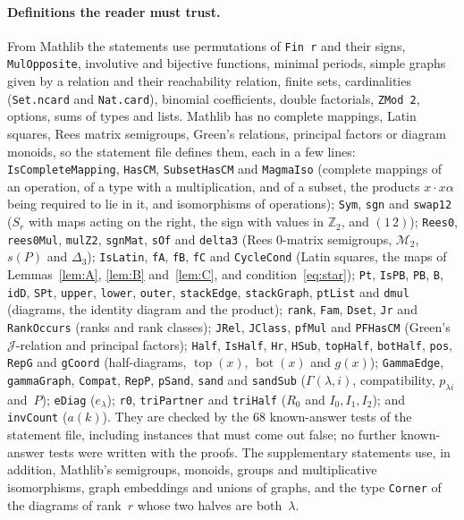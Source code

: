 \documentclass[11pt]{article}
\theoremstyle{remark}
\newcommand{\M}{\mathcal M}
\newcommand{\Z}{\mathbb Z}
\newcommand{\tp}{\operatorname{top}}
\newcommand{\bt}{\operatorname{bot}}
\newcommand{\Mt}{\M_2}
\begin{document}
\paragraph{Definitions the reader must trust.}
From Mathlib the statements use permutations of \texttt{Fin~r} and their
signs, \texttt{MulOpposite}, involutive and bijective functions, minimal
periods, simple graphs given by a relation and their reachability relation,
finite sets, cardinalities (\texttt{Set.ncard} and \texttt{Nat.card}), binomial
coefficients, double factorials, \texttt{ZMod 2}, options, sums of types and
lists. Mathlib has no complete mappings, Latin squares, Rees matrix semigroups,
Green's relations, principal factors or diagram monoids, so the statement file
defines them, each in a few lines: \texttt{IsCompleteMapping}, \texttt{HasCM},
\texttt{SubsetHasCM} and \texttt{MagmaIso} (complete mappings of an operation,
of a type with a multiplication, and of a subset, the products $x\cdot
x\alpha$ being required to lie in it, and isomorphisms of operations); \texttt{Sym}, \texttt{sgn} and \texttt{swap12} ($S_r$ with maps
acting on the right, the sign with values in $\Z_2$, and $(1\,2)$);
\texttt{Rees0}, \texttt{rees0Mul}, \texttt{mulZ2}, \texttt{sgnMat},
\texttt{sOf} and \texttt{delta3} (Rees $0$-matrix semigroups, $\Mt$, $s(P)$
and $\Delta_3$); \texttt{IsLatin}, \texttt{fA}, \texttt{fB}, \texttt{fC} and
\texttt{CycleCond} (Latin squares, the maps of Lemmas~\ref{lem:A},
\ref{lem:B} and~\ref{lem:C}, and condition~\eqref{eq:star}); \texttt{Pt},
\texttt{IsPB}, \texttt{PB}, \texttt{B}, \texttt{idD}, \texttt{SPt},
\texttt{upper}, \texttt{lower}, \texttt{outer}, \texttt{stackEdge},
\texttt{stackGraph}, \texttt{ptList} and \texttt{dmul} (diagrams, the identity
diagram and the product); \texttt{rank}, \texttt{Fam}, \texttt{Dset},
\texttt{Jr} and \texttt{RankOccurs} (ranks and rank classes); \texttt{JRel},
\texttt{JClass}, \texttt{pfMul} and \texttt{PFHasCM} (Green's $\mathcal
J$-relation and principal factors); \texttt{Half}, \texttt{IsHalf},
\texttt{Hr}, \texttt{HSub}, \texttt{topHalf}, \texttt{botHalf}, \texttt{pos},
\texttt{RepG} and \texttt{gCoord} (half-diagrams, $\tp(x)$, $\bt(x)$ and
$g(x)$); \texttt{GammaEdge}, \texttt{gammaGraph}, \texttt{Compat},
\texttt{RepP}, \texttt{pSand}, \texttt{sand} and \texttt{sandSub}
($\Gamma(\lambda,i)$, compatibility, $p_{\lambda i}$ and~$P$); \texttt{eDiag}
($e_\lambda$); \texttt{r0}, \texttt{triPartner} and \texttt{triHalf} ($R_0$ and
$I_0,I_1,I_2$); and \texttt{invCount} ($a(k)$). They are checked by the $68$
known-answer tests of the statement file, including instances that must come
out false; no further known-answer tests were written with the proofs. The
supplementary statements use, in addition, Mathlib's semigroups, monoids,
groups and multiplicative isomorphisms, graph embeddings and unions of graphs,
and the type \texttt{Corner} of the
diagrams of rank~$r$ whose two halves are both~$\lambda$.
\end{document}
